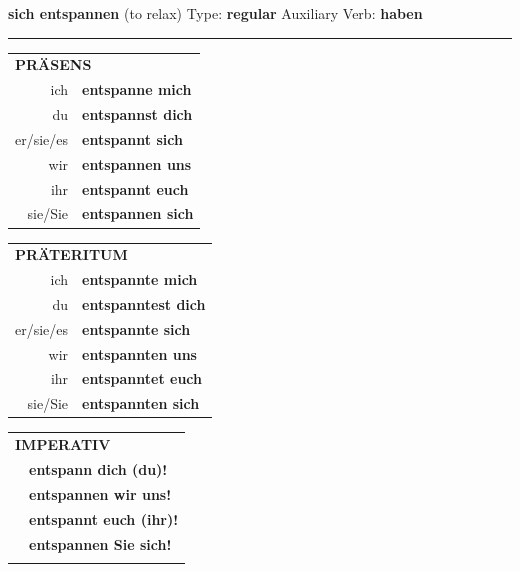 \documentclass[10pt,a4paper]{revtex4-2}
\begin{document}
\begin{verbbox}
    {\Large \bf sich entspannen} (to relax) \hfill Type: \textbf{regular} \hfill Auxiliary Verb: \textbf{haben} 
    
     \vspace{5pt}

    \hrule
    
    \vspace{5pt}

  \begin{tabular}{rl}
     \multicolumn{2}{l}{\textbf{PRÄSENS} }\\
    ich & \textbf{entspanne mich}\\
    du & \textbf{entspannst dich}\\
    er/sie/es & \textbf{entspannt sich}\\
    wir & \textbf{entspannen uns}\\
    ihr & \textbf{entspannt euch}\\
    sie/Sie & \textbf{entspannen sich}\\
  \end{tabular}
  \hfill
     \begin{tabular}{rl}
    \multicolumn{2}{l}{\textbf{PRÄTERITUM} }\\
    ich & \textbf{entspannte mich}\\
    du & \textbf{entspanntest dich}\\
    er/sie/es & \textbf{entspannte sich}\\
    wir & \textbf{entspannten uns}\\
    ihr & \textbf{entspanntet euch}\\
    sie/Sie & \textbf{entspannten sich}\\
  \end{tabular}
  \hfill
  \begin{tabular}{rl}
     \multicolumn{2}{l}{\textbf{IMPERATIV} }\\
   & \textbf{entspann dich (du)!}\\
   & \textbf{entspannen wir uns!}\\
   & \textbf{entspannt euch (ihr)!}\\
   & \textbf{entspannen Sie sich!}\\
   & \vspace{10pt}
  \end{tabular}

    \vspace{10pt}


\end{verbbox}
\end{document}
